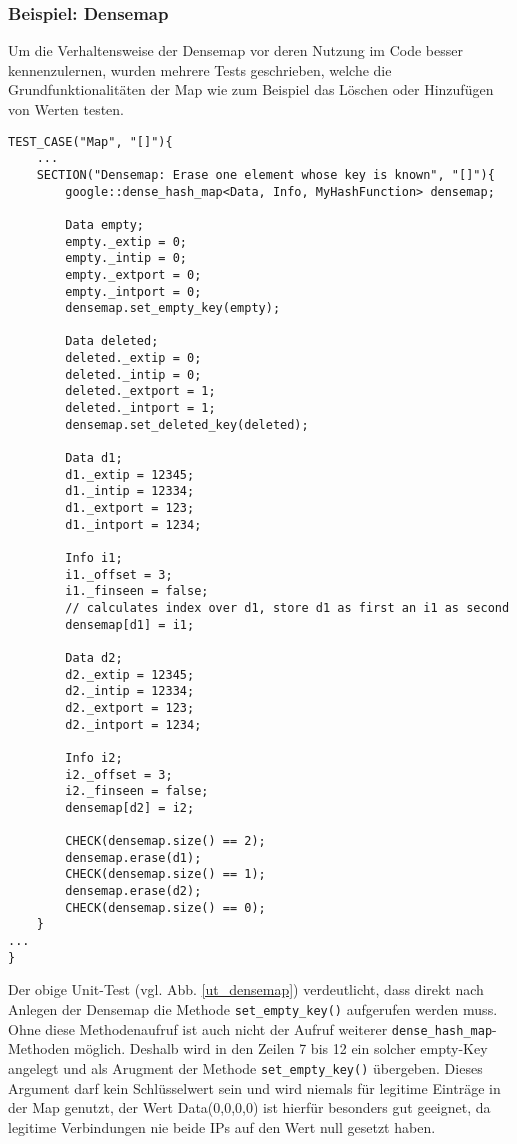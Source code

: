 \documentclass[../review_3.tex]{subfiles}
\begin{document}
\subsubsection{Beispiel: Densemap}
Um die Verhaltensweise der Densemap vor deren Nutzung im Code besser kennenzulernen, wurden mehrere Tests geschrieben, welche die Grundfunktionalitäten der Map wie zum Beispiel das Löschen oder Hinzufügen von Werten testen.
\begin{lstlisting}[caption= {Unit-Tests zum Löschen von Elementen in der Densemap}, label = ut_densemap]
TEST_CASE("Map", "[]"){
    ...
    SECTION("Densemap: Erase one element whose key is known", "[]"){
        google::dense_hash_map<Data, Info, MyHashFunction> densemap;

        Data empty;
        empty._extip = 0;
        empty._intip = 0;
        empty._extport = 0;
        empty._intport = 0;
        densemap.set_empty_key(empty);
        
        Data deleted;
        deleted._extip = 0;
        deleted._intip = 0;
        deleted._extport = 1;
        deleted._intport = 1;
        densemap.set_deleted_key(deleted);
        
        Data d1;
        d1._extip = 12345;
        d1._intip = 12334;
        d1._extport = 123;
        d1._intport = 1234;
        
        Info i1;
        i1._offset = 3;
        i1._finseen = false;
        // calculates index over d1, store d1 as first an i1 as second
        densemap[d1] = i1;
        
        Data d2;
        d2._extip = 12345;
        d2._intip = 12334;
        d2._extport = 123;
        d2._intport = 1234;
        
        Info i2;
        i2._offset = 3;
        i2._finseen = false;
        densemap[d2] = i2;
        
        CHECK(densemap.size() == 2);
        densemap.erase(d1);
        CHECK(densemap.size() == 1);
        densemap.erase(d2);    
        CHECK(densemap.size() == 0);
    }
...
}    \end{lstlisting}

Der obige Unit-Test (vgl. Abb. \ref{ut_densemap}) verdeutlicht, dass direkt nach Anlegen der Densemap die Methode \texttt{set\_empty\_key()} aufgerufen werden muss. Ohne diese Methodenaufruf ist auch nicht der Aufruf weiterer \texttt{dense\_hash\_map}-Methoden möglich. Deshalb wird in den Zeilen 7 bis 12 ein solcher empty-Key angelegt und als Arugment der Methode \texttt{set\_empty\_key()} übergeben. Dieses Argument darf kein Schlüsselwert sein und wird niemals für legitime Einträge in der Map genutzt, der Wert Data(0,0,0,0) ist hierfür besonders gut geeignet, da legitime Verbindungen nie beide IPs auf den Wert null gesetzt haben.
\end{document}
